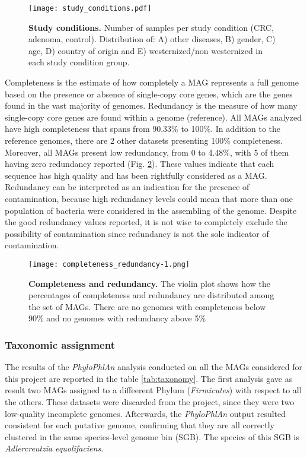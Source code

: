 \begin{figure}[!h]
    \centering
    \texttt{[image: study\_conditions.pdf]}
    \caption{\textbf{Study conditions.} Number of samples per study condition (CRC, adenoma, control). Distribution of: A) other diseases, B) gender, C) age, D) country of origin and E) westernized/non westernized in each study condition group.}
    \label{fig:studyConditions}
\end{figure}

Completeness is the estimate of how completely a MAG represents a full genome based on the presence or absence of single-copy core genes, which are the genes found in the vast majority of genomes. Redundancy is the measure of how many single-copy core genes are found within a genome (reference). All MAGs analyzed have high completeness that spans from 90.33\% to 100\%. In addition to the reference genomes, there are 2 other datasets presenting 100\% completeness. Moreover, all MAGs present low redundancy, from 0 to 4.48\%, with 5 of them having zero redundancy reported (Fig. \ref{fig:completeness}). These values indicate that each sequence has high quality and has been rightfully considered as a MAG. Redundancy can be interpreted as an indication for the presence of contamination, because high redundancy levels could mean that more than one population of bacteria were considered in the assembling of the genome. Despite the good redundancy values reported, it is not wise to completely exclude the possibility of contamination since redundancy is not the sole indicator of contamination.

\begin{figure}[!h]
    \centering
    \texttt{[image: completeness\_redundancy-1.png]}
    \caption{\textbf{Completeness and redundancy.} The violin plot shows how the percentages of completeness and redundancy are distributed among the set of MAGs. There are no genomes with completeness below 90\% and no genomes with redundancy above 5\%}
    \label{fig:completeness}
\end{figure}

\subsubsection*{Taxonomic assignment}

The results of the \textit{PhyloPhlAn} analysis conducted on all the MAGs considered for this project are reported in the table \ref{tab:taxonomy}. The first analysis gave as result two MAGs assigned to a diffeerent Phylum (\textit{Firmicutes}) with respect to all the others. These datasets were discarded from the project, since they were two low-quality incomplete genomes. Afterwards, the \textit{PhyloPhlAn} output resulted consistent for each putative genome, confirming that they are all correctly clustered in the same species-level genome bin (SGB). The species of this SGB is \textit{Adlercreutzia equolifaciens}.\\

